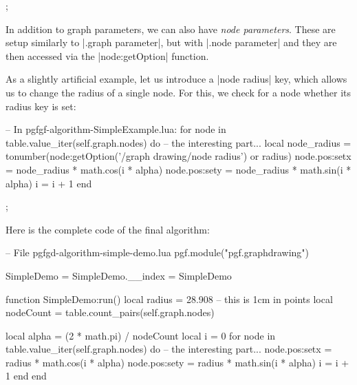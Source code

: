 \begin{codeexample}[]
\tikz {};
\end{codeexample}


In addition to graph parameters, we can also have \emph{node
  parameters}. These are setup similarly to |.graph parameter|, but
with |.node parameter| and they are then accessed via the
|node:getOption| function.

As a slightly artificial example, let us introduce a |node radius|
key, which allows us to change the radius of a single node. For this,
we check for a node whether its radius key is set:

\begin{codeexample}
-- In pgfgf-algorithm-SimpleExample.lua:
   for node in table.value_iter(self.graph.nodes) do
      -- the interesting part...
      local node_radius = tonumber(node:getOption('/graph drawing/node radius')
                                   or radius)
      node.pos:set{x = node_radius * math.cos(i * alpha)}
      node.pos:set{y = node_radius * math.sin(i * alpha)}
      i = i + 1
   end
   
\end{codeexample}

\begin{codeexample}[]
\tikz {};
\end{codeexample}

Here is the complete code of the final algorithm:
\begin{codeexample}
-- File pgfgd-algorithm-simple-demo.lua
pgf.module("pgf.graphdrawing")

SimpleDemo = {}
SimpleDemo.__index = SimpleDemo

function SimpleDemo:run()
   local radius = 28.908  -- this is 1cm in points
   local nodeCount = table.count_pairs(self.graph.nodes)

   local alpha = (2 * math.pi) / nodeCount
   local i = 0
   for node in table.value_iter(self.graph.nodes) do
      -- the interesting part...
      node.pos:set{x = radius * math.cos(i * alpha)}
      node.pos:set{y = radius * math.sin(i * alpha)}
      i = i + 1
   end
end
\end{codeexample}

